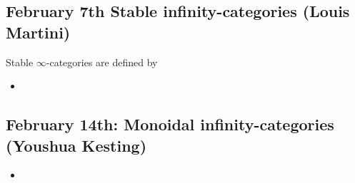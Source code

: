 \documentclass{amsart}
\theoremstyle{definition}
\theoremstyle{remark}
\begin{document}

\subsection{February 7th Stable infinity-categories (Louis Martini)
}

Stable $\infty$-categories are defined by 

\begin{itemize}
\item 
\end{itemize}

\subsection{February 14th: Monoidal infinity-categories (Youshua Kesting)}

\begin{itemize}
\item 
\end{itemize}

\printbibliography
\end{document}
